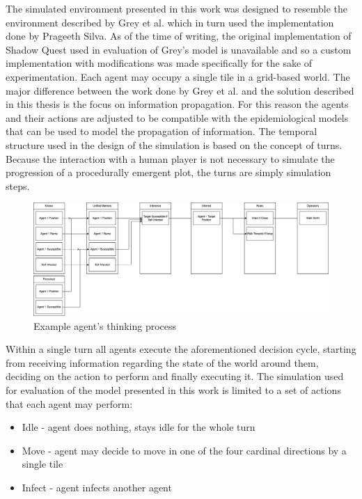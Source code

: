 \label{chapter:chapter2}

The simulated environment presented in this work was designed to resemble the environment described by Grey et al.\cite{grey2011procedural} which in turn used the implementation done by Prageeth Silva\cite{silva2010shadow}.
As of the time of writing, the original implementation of Shadow Quest used in evaluation of Grey's model is unavailable and so a custom implementation with modifications was made specifically for the sake of experimentation.
Each agent may occupy a single tile in a grid-based world.
The major difference between the work done by Grey et al. and the solution described in this thesis is the focus on information propagation.
For this reason the agents and their actions are adjusted to be compatible with the epidemiological models that can be used to model the propagation of information.
The temporal structure used in the design of the simulation is based on the concept of turns.
Because the interaction with a human player is not necessary to simulate the progression of a procedurally emergent plot, the turns are simply simulation steps.

\begin{figure}[H]
    \centering
    \includegraphics[width=1.0\textwidth]{images/chapter1/agent_think.drawio.png}
    \caption{Example agent's thinking process}\label{fig:agent_think.drawio.png}
\end{figure}

Within a single turn all agents execute the aforementioned decision cycle, starting from receiving information regarding the state of the world around them, deciding on the action to perform and finally executing it.
The simulation used for evaluation of the model presented in this work is limited to a set of actions that each agent may perform:

\begin{itemize}
    \item Idle - agent does nothing, stays idle for the whole turn
    \item Move - agent may decide to move in one of the four cardinal directions by a single tile
    \item Infect - agent infects another agent
\end{itemize}

